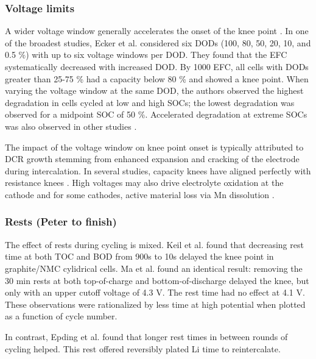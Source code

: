 \documentclass{article}
\begin{document}
\subsubsection{Voltage limits} 
A wider voltage window generally accelerates the onset of the knee point \cite{ecker_calendar_2014, pfrang_long-term_2018, klett_non-uniform_2014, ma_novel_2019, petzl_lithium_2015, schuster_nonlinear_2015}. In one of the broadest studies, Ecker et al. \cite{ecker_calendar_2014} considered six DODs (100, 80, 50, 20, 10, and 0.5 \%) with up to six voltage windows per DOD. They found that the EFC systematically decreased with increased DOD. By 1000 EFC, all cells with DODs greater than 25-75 \% had a capacity below 80 \% and showed a knee point. When varying the voltage window at the same DOD, the authors observed the highest degradation in cells cycled at low and high SOCs; the lowest degradation was observed for a midpoint SOC of 50 \%. Accelerated degradation at extreme SOCs was also observed in other studies \cite{aiken_accelerated_2020,ma_novel_2019, zhu_investigation_2021}.

The impact of the voltage window on knee point onset is typically attributed to DCR growth stemming from enhanced expansion and cracking of the electrode during intercalation. In several studies, capacity knees have aligned perfectly with resistance knees \cite{ecker_calendar_2014, klett_non-uniform_2014, schuster_nonlinear_2015, zhu_investigation_2021}. High voltages may also drive electrolyte oxidation at the cathode \cite{aiken_accelerated_2020} and for some cathodes, active material loss via Mn dissolution \cite{ma_novel_2019}. 



\subsubsection{Rests (Peter to finish)}

The effect of rests during cycling is mixed. 
Keil et al.\cite{keil_linear_2019} found that decreasing rest time at both TOC and BOD from 900s to 10s delayed the knee point in graphite/NMC cylidrical cells.
Ma et al.\cite{ma_editors_2019} found an identical result: removing the 30 min rests at both top-of-charge and bottom-of-discharge delayed the knee, but only with an upper cutoff voltage of 4.3 V. The rest time had no effect at 4.1 V.
These observations were rationalized by less time at high potential when plotted as a function of cycle number.

In contrast, Epding et al.\cite{epding_investigation_2019} found that longer rest times in between rounds of cycling helped. This rest offered reversibly plated Li time to reintercalate.
\end{document}
